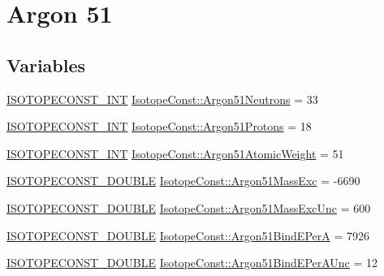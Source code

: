 \hypertarget{group___isotope_const-_argon-_ar51}{}\section{Argon 51}
\label{group___isotope_const-_argon-_ar51}
\subsection*{Variables}
\begin{DoxyCompactItemize}
\item 
\mbox{\hyperlink{group___isotope_const-_macros_ga5f18360b3e99483a35c32d789e62621c}{I\+S\+O\+T\+O\+P\+E\+C\+O\+N\+S\+T\+\_\+\+I\+NT}} \mbox{\hyperlink{group___isotope_const-_argon-_ar51_ga20030ada5682057f66c5fb23695eff96}{Isotope\+Const\+::\+Argon51\+Neutrons}} = 33
\item 
\mbox{\hyperlink{group___isotope_const-_macros_ga5f18360b3e99483a35c32d789e62621c}{I\+S\+O\+T\+O\+P\+E\+C\+O\+N\+S\+T\+\_\+\+I\+NT}} \mbox{\hyperlink{group___isotope_const-_argon-_ar51_gabea32fc55db0e3608104d0ea51d3c746}{Isotope\+Const\+::\+Argon51\+Protons}} = 18
\item 
\mbox{\hyperlink{group___isotope_const-_macros_ga5f18360b3e99483a35c32d789e62621c}{I\+S\+O\+T\+O\+P\+E\+C\+O\+N\+S\+T\+\_\+\+I\+NT}} \mbox{\hyperlink{group___isotope_const-_argon-_ar51_ga8c404ac237a34c91840670054762fbaf}{Isotope\+Const\+::\+Argon51\+Atomic\+Weight}} = 51
\item 
\mbox{\hyperlink{group___isotope_const-_macros_ga8f45a7272ce02c0b4c65c44636ed719a}{I\+S\+O\+T\+O\+P\+E\+C\+O\+N\+S\+T\+\_\+\+D\+O\+U\+B\+LE}} \mbox{\hyperlink{group___isotope_const-_argon-_ar51_ga74108c1182d16efd63b4b4248ccbce5c}{Isotope\+Const\+::\+Argon51\+Mass\+Exc}} = -\/6690
\item 
\mbox{\hyperlink{group___isotope_const-_macros_ga8f45a7272ce02c0b4c65c44636ed719a}{I\+S\+O\+T\+O\+P\+E\+C\+O\+N\+S\+T\+\_\+\+D\+O\+U\+B\+LE}} \mbox{\hyperlink{group___isotope_const-_argon-_ar51_ga8587a53edfd77c94f668ff7bbec40bfb}{Isotope\+Const\+::\+Argon51\+Mass\+Exc\+Unc}} = 600
\item 
\mbox{\hyperlink{group___isotope_const-_macros_ga8f45a7272ce02c0b4c65c44636ed719a}{I\+S\+O\+T\+O\+P\+E\+C\+O\+N\+S\+T\+\_\+\+D\+O\+U\+B\+LE}} \mbox{\hyperlink{group___isotope_const-_argon-_ar51_ga1cfcf14bf3c747ed4a8f6cec9e97db94}{Isotope\+Const\+::\+Argon51\+Bind\+E\+PerA}} = 7926
\item 
\mbox{\hyperlink{group___isotope_const-_macros_ga8f45a7272ce02c0b4c65c44636ed719a}{I\+S\+O\+T\+O\+P\+E\+C\+O\+N\+S\+T\+\_\+\+D\+O\+U\+B\+LE}} \mbox{\hyperlink{group___isotope_const-_argon-_ar51_ga568d0274550fb29941f0b5d175391879}{Isotope\+Const\+::\+Argon51\+Bind\+E\+Per\+A\+Unc}} = 12

\end{DoxyCompactItemize}
